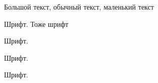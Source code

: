 \documentclass[a4paper, 12pt]{article}
\begin{document}
    {\large Большой текст}, обычный текст, {\small маленький текст}

    Шрифт.
    Тоже шрифт

    {\rmfamily Шрифт.}

    {\sffamily Шрифт.}

    {\ttfamily Шрифт.}

\end{document}
